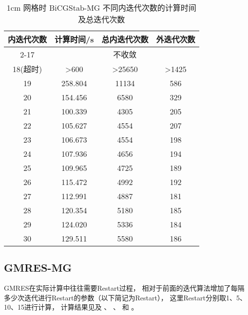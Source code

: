 \begin{datasheet}
\begin{table}
\centering
\caption{1cm 网格时 BiCGStab-MG 不同内迭代次数的计算时间及总迭代次数}
\label{tab:equsolve.iter.bicgstab-mg.1cm}
\begin{tabular}{cccc}
\toprule
内迭代次数 & 计算时间/s & 总内迭代次数 & 外迭代次数\\
\midrule
2-17 & \multicolumn{3}{c}{不收敛} \\ %
18(超时) & >600 & >25650 & >1425 \\ %
19 & 258.804 & 11134 & 586\\
20 & 154.456 & 6580 & 329\\
21 & 100.339 & 4305 & 205\\
22 & 105.627 & 4554 & 207\\
23 & 106.673 & 4554 & 198\\
24 & 107.936 & 4656 & 194\\
25 & 109.965 & 4725 & 189\\
26 & 115.472 & 4992 & 192\\
27 & 112.991 & 4887 & 181\\
28 & 120.354 & 5180 & 185\\
29 & 124.020 & 5336 & 184\\
30 & 129.511 & 5580 & 186\\
\bottomrule
\end{tabular}
\end{table}

\end{datasheet}

\subsection{GMRES-MG}
GMRES在实际计算中往往需要Restart过程，
相对于前面的迭代算法增加了每隔多少次迭代进行Restart的参数（以下简记为Restart），
这里Restart分别取1、5、10、15进行计算，
计算结果见及
、
、
和
。

